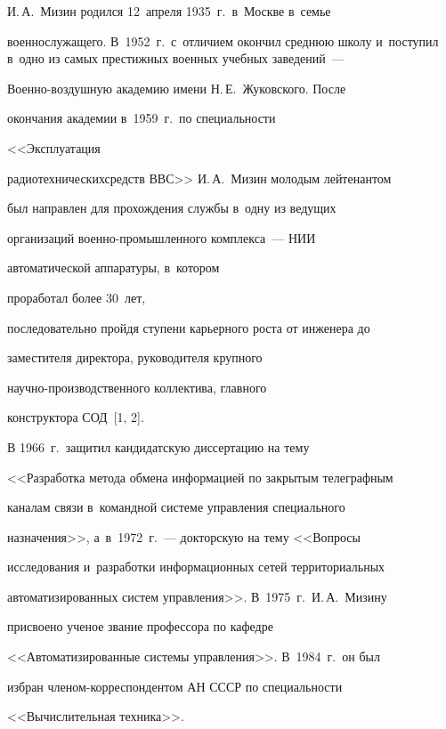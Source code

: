      И.\,А.~Мизин родился 12~апреля 1935~г.\ в~Москве в~семье


военнослужащего. В~1952~г.\ с~отличием окончил среднюю школу и~поступил в~одно из самых престижных военных учебных заведений~---


Во\-ен\-но-воз\-душ\-ную академию име\-ни Н.\,Е.~Жуковского. После


окончания академии в~1959~г.\ по специальности


 <<Эксплуатация


радиотехнических\linebreak средств ВВС>> И.\,А.~Мизин моло\-дым лейтенантом


был направлен для прохождения службы в~одну из ведущих


организаций во\-ен\-но-про\-мыш\-лен\-но\-го комплекса~--- НИИ\linebreak


автоматической аппаратуры, в~ко\-тором


 проработал более 30~лет,


последовательно пройдя ступени карь\-ерного роста от инженера до


замести\-теля директора, руководителя крупного


     на\-уч\-но-про\-из\-вод\-ст\-вен\-но\-го коллектива, главного


конструктора СОД~[1, 2].





     В 1966~г.\ защитил кандидатскую диссертацию на тему


<<Разработка метода обмена информацией по закрытым телеграфным


каналам связи в~командной системе управления специального


назначения>>, а~в~1972~г.~--- докторскую на тему <<Вопросы


исследования и~разработки информационных сетей территориальных


автоматизированных сис\-тем управления>>. В~1975~г.\ И.\,А.~Мизину


присвоено ученое звание профессора по кафедре


<<Автоматизированные сис\-те\-мы управления>>. В~1984~г.\ он был


избран чле\-ном-кор\-рес\-пон\-ден\-том АН СССР по специальности


<<Вы\-чис\-ли\-тель\-ная техника>>.





